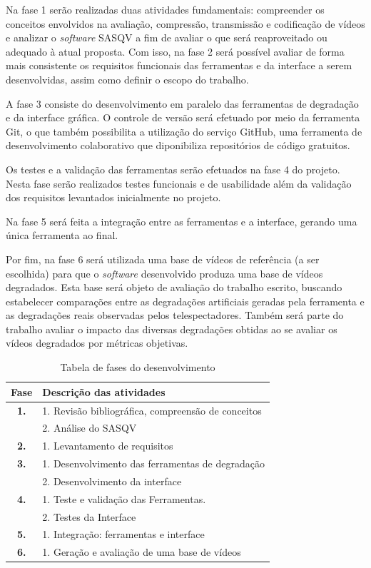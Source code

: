 Na fase 1 serão realizadas duas atividades fundamentais: compreender os conceitos envolvidos na avaliação, compressão, transmissão e codificação de vídeos e analizar o \emph{software}
SASQV a fim de avaliar o que será reaproveitado ou adequado à atual proposta. Com isso, na fase 2 será possível avaliar de forma mais consistente os requisitos funcionais das ferramentas 
e da interface a serem desenvolvidas, assim como definir o escopo do trabalho.

A fase 3 consiste do desenvolvimento em paralelo das ferramentas de degradação e da interface gráfica. O controle de versão será efetuado por meio da ferramenta Git, o que também possibilita a utilização do serviço GitHub, uma ferramenta de desenvolvimento colaborativo que diponibiliza repositórios de código gratuitos.

Os testes e a validação das ferramentas serão efetuados na fase 4 do projeto. Nesta fase serão realizados testes funcionais e de usabilidade além da validação dos requisitos levantados inicialmente no projeto.

Na fase 5 será feita a integração entre as ferramentas e a interface, gerando uma única ferramenta ao final.

Por fim, na fase 6 será utilizada uma base de vídeos de referência (a ser escolhida) para que o \emph{software} desenvolvido produza uma base de vídeos degradados. 
Esta base será objeto de avaliação do trabalho escrito, buscando estabelecer comparações entre as degradações artificiais geradas pela ferramenta e as degradações reais observadas pelos telespectadores.
Também será parte do trabalho avaliar o impacto das diversas degradações obtidas ao se avaliar os vídeos degradados por métricas objetivas.

\begin{table}[htb]
	\centering
	\caption{Tabela de fases do desenvolvimento}
	\label{tab:metodologia}
	\begin{tabular}{c|l}
	\hline
	\textbf{Fase} & \textbf{Descrição das atividades} \\
	\hline
	\textbf{1.} & 1. Revisão bibliográfica, compreensão de conceitos \\
		& 2. Análise do SASQV \\
	\textbf{2.} & 1. Levantamento de requisitos \\
	\textbf{3.} & 1. Desenvolvimento das ferramentas de degradação \\
		& 2. Desenvolvimento da interface \\
	\textbf{4.} & 1. Teste e validação das Ferramentas. \\
		& 2. Testes da Interface \\
	\textbf{5.} & 1. Integração: ferramentas e interface \\
	\textbf{6.} & 1. Geração e avaliação de uma base de vídeos \\
	\hline
	\end{tabular}
\end{table}	
